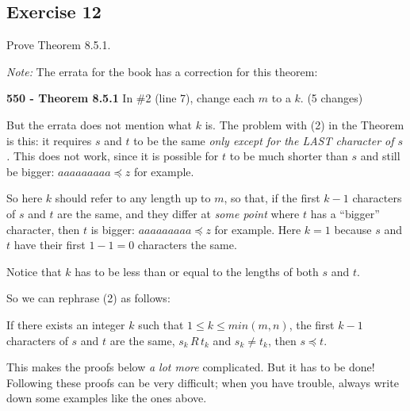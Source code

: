 \documentclass[14pt]{extarticle}
\begin{document}
\subsection{Exercise 12}
Prove Theorem 8.5.1.

        {\it Note:} The errata for the book has a correction for this theorem:

{\bf 550 - Theorem 8.5.1} In \#2 (line 7), change each $m$ to a $k$. (5 changes)

But the errata does not mention what $k$ is. The problem with (2) in the Theorem is this: it requires $s$ and $t$ to
be the same {\it only except for the LAST character of $s$.} This does not work, since it is possible for $t$ to
be much shorter than $s$ and still be bigger: \(aaaaaaaaa \preceq z\) for example.

So here $k$ should refer to any length up to $m$, so that, if the first $k-1$ characters of $s$ and $t$ are the same,
and they differ at {\it some point} where $t$ has a ``bigger'' character, then $t$ is bigger: \(aaaaaaaaa
\preceq z\) for example. Here $k = 1$ because $s$ and $t$ have their first $1-1 = 0$ characters the same.

Notice that $k$ has to be less than or equal to the lengths of both $s$ and $t$.

So we can rephrase (2) as follows:

If there exists an integer $k$ such that \(1 \leq k \leq min(m,n)\), the first $k-1$ characters of $s$ and $t$ are
the same, \(s_k \,R\, t_k\) and \(s_k \neq t_k\), then \(s \preceq t\).

This makes the proofs below {\it a lot more} complicated. But it has to be done! Following these proofs can be very
difficult; when you have trouble, always write down some examples like the ones above.
\end{document}
